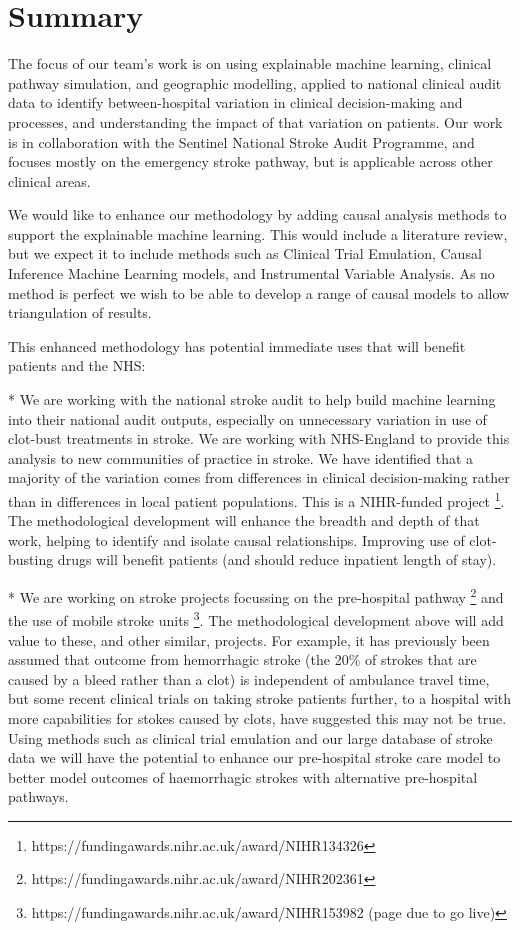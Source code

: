 \section*{Summary}


The focus of our team's work is on using explainable machine learning, clinical pathway simulation, and geographic modelling, applied to national clinical audit data to identify between-hospital variation in clinical decision-making and processes, and understanding the impact of that variation on patients. Our work is in collaboration with the Sentinel National Stroke Audit Programme, and focuses mostly on the emergency stroke pathway, but is applicable across other clinical areas.

We would like to enhance our methodology by adding causal analysis methods to support the explainable machine learning. This would include a literature review, but we expect it to include methods such as Clinical Trial Emulation, Causal Inference Machine Learning models, and Instrumental Variable Analysis. As no method is perfect we wish to be able to develop a range of causal models to allow triangulation of results. 

This enhanced methodology has potential immediate uses that will benefit patients and the NHS:

* We are working with the national stroke audit to help build machine learning into their national audit outputs, especially on unnecessary variation in use of clot-bust treatments in stroke. We are working with NHS-England to provide this analysis to new communities of practice in stroke. We have identified that a majority of the variation comes from differences in clinical decision-making rather than in differences in local patient populations. This is a NIHR-funded project \footnote{https://fundingawards.nihr.ac.uk/award/NIHR134326}. The methodological development will enhance the breadth and depth of that work, helping to identify and isolate causal relationships. Improving use of clot-busting drugs will benefit patients (and should reduce inpatient length of stay).

* We are working on stroke projects focussing on the pre-hospital pathway \footnote{https://fundingawards.nihr.ac.uk/award/NIHR202361} and the use of mobile stroke units \footnote{https://fundingawards.nihr.ac.uk/award/NIHR153982 (page due to go live)}. The methodological development above will add value to these, and other similar, projects. For example, it has previously been assumed that outcome from hemorrhagic stroke (the 20\% of strokes that are caused by a bleed rather than a clot) is independent of ambulance travel time, but some recent clinical trials on taking stroke patients further, to a hospital with more capabilities for stokes caused by clots, have suggested this may not be true. Using methods such as clinical trial emulation and our large database of stroke data we will have the potential to enhance our pre-hospital stroke care model to better model outcomes of haemorrhagic strokes with alternative pre-hospital pathways.

